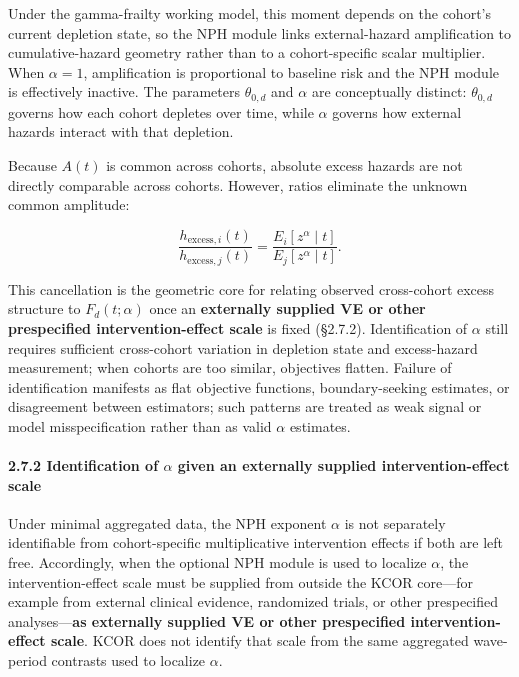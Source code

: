 \documentclass[
]{article}
\begin{document}
Under the gamma-frailty working model, this moment depends on the
cohort's current depletion state, so the NPH module links
external-hazard amplification to cumulative-hazard geometry rather than
to a cohort-specific scalar multiplier. When \(\alpha=1\), amplification
is proportional to baseline risk and the NPH module is effectively
inactive. The parameters \(\theta_{0,d}\) and \(\alpha\) are
conceptually distinct: \(\theta_{0,d}\) governs how each cohort depletes
over time, while \(\alpha\) governs how external hazards interact with
that depletion.

Because \(A(t)\) is common across cohorts, absolute excess hazards are
not directly comparable across cohorts. However, ratios eliminate the
unknown common amplitude:

\[
\frac{h_{\mathrm{excess},i}(t)}{h_{\mathrm{excess},j}(t)}
=
\frac{E_i[z^{\alpha}\mid t]}{E_j[z^{\alpha}\mid t]}.
\]

This cancellation is the geometric core for relating observed
cross-cohort excess structure to \(F_d(t;\alpha)\) once an
\textbf{externally supplied VE or other prespecified intervention-effect
scale} is fixed (§2.7.2). Identification of \(\alpha\) still requires
sufficient cross-cohort variation in depletion state and excess-hazard
measurement; when cohorts are too similar, objectives flatten. Failure
of identification manifests as flat objective functions,
boundary-seeking estimates, or disagreement between estimators; such
patterns are treated as weak signal or model misspecification rather
than as valid \(\alpha\) estimates.

\paragraph{\texorpdfstring{2.7.2 Identification of \(\alpha\) given an
externally supplied intervention-effect
scale}{2.7.2 Identification of \textbackslash alpha given an externally supplied intervention-effect scale}}\label{identification-of-alpha-given-an-externally-supplied-intervention-effect-scale}

Under minimal aggregated data, the NPH exponent \(\alpha\) is not
separately identifiable from cohort-specific multiplicative intervention
effects if both are left free. Accordingly, when the optional NPH module
is used to localize \(\alpha\), the intervention-effect scale must be
supplied from outside the KCOR core---for example from external clinical
evidence, randomized trials, or other prespecified analyses---\textbf{as
externally supplied VE or other prespecified intervention-effect scale}.
KCOR does not identify that scale from the same aggregated wave-period
contrasts used to localize \(\alpha\).
\end{document}

